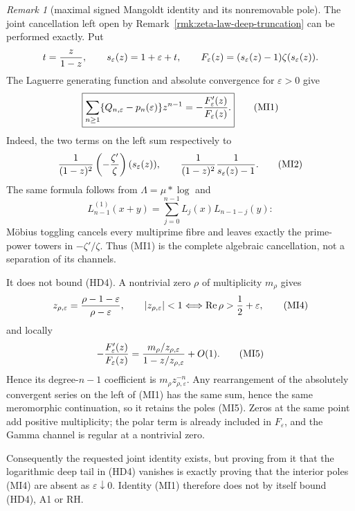 \documentclass[11pt]{amsart}
\theoremstyle{definition}
\theoremstyle{remark}
\newtheorem{remark}[theorem]{Remark}
\theoremstyle{definition}
\renewcommand{\Re}{\operatorname{Re}}
\begin{document}
\begin{remark}[maximal signed Mangoldt identity and its nonremovable pole]
\label{rmk:maximal-signed-mangoldt-identity}
The joint cancellation left open by
Remark~\ref{rmk:zeta-law-deep-truncation} can be performed exactly.  Put
\[
 t={z\over1-z},\qquad s_\varepsilon(z)=1+\varepsilon+t,
 \qquad F_\varepsilon(z)=
 (s_\varepsilon(z)-1)\zeta(s_\varepsilon(z)).
\]
The Laguerre generating function and absolute convergence for
$\varepsilon>0$ give
\[
 \boxed{
 \sum_{n\ge1}\{Q_{n,\varepsilon}-p_n(\varepsilon)\}z^{n-1}
 =-{F_\varepsilon'(z)\over F_\varepsilon(z)}.}           \tag{MI1}
\]
Indeed, the two terms on the left sum respectively to
\[
 {1\over(1-z)^2}\left(-{\zeta'\over\zeta}\right)
       (s_\varepsilon(z)),\qquad
 {1\over(1-z)^2}{1\over s_\varepsilon(z)-1}.             \tag{MI2}
\]
The same formula follows from $\Lambda=\mu*\log$ and
\[
 L_{n-1}^{(1)}(x+y)=
 \sum_{j=0}^{n-1}L_j(x)L_{n-1-j}(y):                    \tag{MI3}
\]
Möbius toggling cancels every multiprime fibre and leaves exactly the
prime-power towers in $-\zeta'/\zeta$.  Thus (MI1) is the complete
algebraic cancellation, not a separation of its channels.

It does not bound (HD4).  A nontrivial zero $\rho$ of multiplicity
$m_\rho$ gives
\[
 z_{\rho,\varepsilon}
 ={\rho-1-\varepsilon\over\rho-\varepsilon},\qquad
 |z_{\rho,\varepsilon}|<1
 \Longleftrightarrow
 \Re\rho>{1\over2}+\varepsilon,                         \tag{MI4}
\]
and locally
\[
 -{F_\varepsilon'(z)\over F_\varepsilon(z)}
 ={m_\rho/z_{\rho,\varepsilon}
    \over1-z/z_{\rho,\varepsilon}}+O(1).                \tag{MI5}
\]
Hence its degree-$n-1$ coefficient is
$m_\rho z_{\rho,\varepsilon}^{-n}$.  Any rearrangement of the absolutely
convergent series on the left of (MI1) has the same sum, hence the same
meromorphic continuation, so it retains the poles (MI5).
Zeros at the same point add positive multiplicity; the polar term is
already included in $F_\varepsilon$, and the Gamma channel is regular at a
nontrivial zero.

Consequently the requested joint identity exists, but proving from it that
the logarithmic deep tail in (HD4) vanishes is exactly proving that the
interior poles (MI4) are absent as $\varepsilon\downarrow0$.  Identity
(MI1) therefore does not by itself bound (HD4), A1 or RH.
\end{remark}
\end{document}

